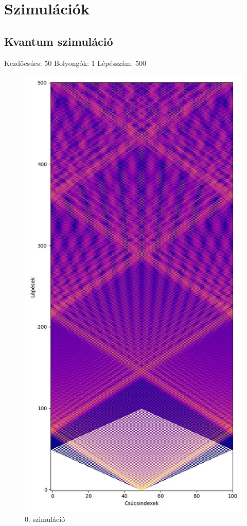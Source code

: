 \documentclass[14pt,a4paper]{article}
\begin{document}
\section{Szimulációk}
\subsection{Kvantum szimuláció}
Kezdőcsúcs: 50
Bolyongók: 1
Lépésszám: 500
\begin{figure}[H]
\centering
\includegraphics[width = 0.7\columnwidth]{sim00.jpg}
\caption{0. szimuláció}
\end{figure}
\end{document}
